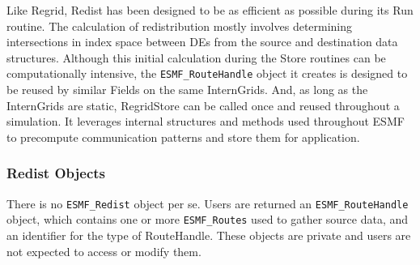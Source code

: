 


Like Regrid, Redist has been designed to be as efficient as possible during its
Run routine.  The calculation of redistribution mostly involves determining
intersections in index space between DEs from the source and destination data
structures.  Although this initial calculation during the Store routines
can be computationally intensive, the {\tt ESMF\_RouteHandle} object
it creates is designed to be reused by similar Fields on the same InternGrids.
And, as long as the InternGrids are static, RegridStore can be called once
and reused throughout a simulation.  It leverages internal structures
and methods used throughout ESMF to precompute communication patterns and
store them for application.

\subsubsection{Redist Objects}

There is no {\tt ESMF\_Redist} object per se.  Users are returned an
{\tt ESMF\_RouteHandle} object, which contains one or more {\tt ESMF\_Routes}
used to gather source data, and an identifier for the type of RouteHandle.  These
objects are private and users are not expected to access or modify them.
